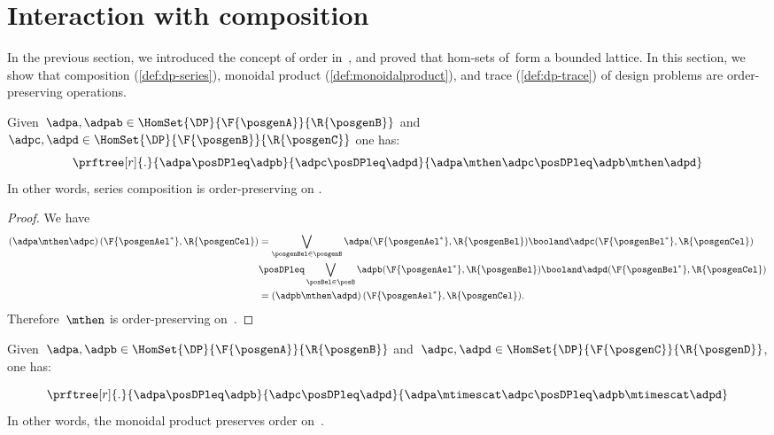 
\section{Interaction with composition}
In the previous section, we introduced the concept of order in~\DP, and proved that hom-sets of~\DP form a bounded lattice.
In this section, we show that composition (\cref{def:dp-series}), monoidal product (\cref{def:monoidalproduct}), and trace (\cref{def:dp-trace}) of design problems are order-preserving operations.

\begin{lemma}
	\label{lem:series_pres_order}
	Given~$\adpa,\adpab \in \HomSet{\DP}{\F{\posgenA}}{\R{\posgenB}}$ and~$\adpc,\adpd \in \HomSet{\DP}{\F{\posgenB}}{\R{\posgenC}}$ one has:
	\begin{equation}
		\prftree[r]{.}{\adpa\posDPleq \adpb}{\adpc\posDPleq \adpd}{\adpa\mthen \adpc \posDPleq \adpb\mthen \adpd}
	\end{equation}
	In other words, series composition is order-preserving on \DP.
\end{lemma}

\begin{proof}
	We have
	\begin{equation}
		\label{eq:series_pres_ord}
		\begin{aligned}
			\left( \adpa\mthen \adpc\right)(\F{\posgenAel^*},\R{\posgenCel}) & =
			\bigvee_{\posgenBel\in \posgenB}\adpa(\F{\posgenAel^*},\R{\posgenBel})\booland \adpc(\F{\posgenBel^*},\R{\posgenCel})                                                                         \\
			                                                                 & \posDPleq \bigvee_{\posBel\in \posB} \adpb(\F{\posgenAel^*},\R{\posgenBel})\booland \adpd(\F{\posgenBel^*},\R{\posgenCel}) \\
			                                                                 & =\left( \adpb\mthen \adpd\right)(\F{\posgenAel^*},\R{\posgenCel}).
		\end{aligned}
	\end{equation}
	Therefore~$\mthen$ is order-preserving on~\DP.
\end{proof}

\begin{lemma}
	\label{lem:tens_pres_order}
	Given~$\adpa,\adpb \in \HomSet{\DP}{\F{\posgenA}}{\R{\posgenB}}$ and~$\adpc,\adpd \in \HomSet{\DP}{\F{\posgenC}}{\R{\posgenD}}$, one has:

	\begin{equation}
		\prftree[r]{.}{\adpa\posDPleq \adpb}{\adpc\posDPleq \adpd}{\adpa\mtimescat \adpc \posDPleq \adpb\mtimescat \adpd}
	\end{equation}
	In other words, the monoidal product preserves order on~\DP.
\end{lemma}

